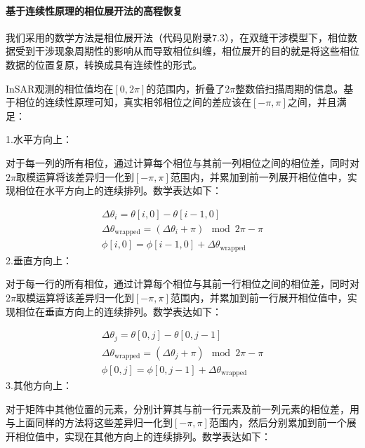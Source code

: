 \documentclass[a4paper]{article}
\begin{document}
	\paragraph{基于连续性原理的相位展开法的高程恢复}
	我们采用的数学方法是相位展开法（代码见附录7.3），在双缝干涉模型下，相位数据受到干涉现象周期性的影响从而导致相位纠缠，相位展开的目的就是将这些相位数据的位置复原，转换成具有连续性的形式。\par
	InSAR观测的相位值均在$ [0,2\pi] $的范围内，折叠了$ 2\pi $整数倍扫描周期的信息。基于相位的连续性原理可知，真实相邻相位之间的差应该在$ [-\pi,\pi] $之间，并且满足：\par
	\noindent1.水平方向上：\par\indent
	对于每一列的所有相位，通过计算每个相位与其前一列相位之间的相位差，同时对$ 2\pi $取模运算将该差异归一化到$ [-\pi,\pi] $范围内，并累加到前一列展开相位值中，实现相位在水平方向上的连续排列。数学表达如下：\par
    \begin{subequations}
		\begin{align}
			\Delta \theta_i = \theta[i, 0] - \theta[i-1, 0] \\
			\Delta \theta_{\text{wrapped}} = (\Delta \theta_i + \pi) \mod 2\pi - \pi \\
			\phi[i, 0] = \phi[i-1, 0] + \Delta \theta_{\text{wrapped}}
		\end{align}
	\end{subequations}
	2.垂直方向上：\par
	对于每一行的所有相位，通过计算每个相位与其前一行相位之间的相位差，同时对$ 2\pi $取模运算将该差异归一化到$ [-\pi,\pi] $范围内，并累加到前一行展开相位值中，实现相位在垂直方向上的连续排列。数学表达如下：\par
	\begin{subequations}
		\begin{align}
			\Delta \theta_j = \theta[0, j] - \theta[0, j-1] \\
			\Delta \theta_{\text{wrapped}} = (\Delta \theta_j + \pi) \mod 2\pi - \pi \\
			\phi[0, j] = \phi[0, j-1] + \Delta \theta_{\text{wrapped}}
		\end{align}
	\end{subequations}
	3.其他方向上：\par
	对于矩阵中其他位置的元素，分别计算其与前一行元素及前一列元素的相位差，用与上面同样的方法将这些差异归一化到$ [-\pi,\pi] $范围内，然后分别累加到前一个展开相位值中，实现在其他方向上的连续排列。数学表达如下：\par
\end{document}
